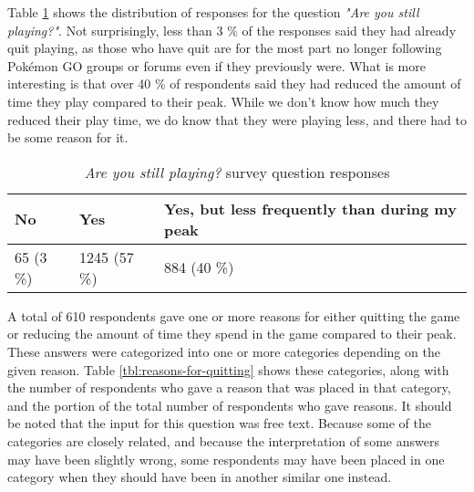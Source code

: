 
Table \ref{tbl:still-playing} shows the distribution of responses for the question \emph{"Are you still playing?"}. Not surprisingly, less than 3 \% of the responses said they had already quit playing, as those who have quit are for the most part no longer following Pokémon GO groups or forums even if they previously were. What is more interesting is that over 40 \% of respondents said they had reduced the amount of time they play compared to their peak. While we don't know how much they reduced their play time, we do know that they were playing less, and there had to be some reason for it.

\begin{table}[h]
	\centering
	\begin{tabular}{|l|l|l|}
		\hline
		\textbf{No} & \textbf{Yes} & \textbf{Yes, but less frequently than during my peak}\\
		\hline\hline
		65 (3 \%) & 1245 (57 \%) & 884 (40 \%)\\\hline
	\end{tabular}
	\caption{\emph{Are you still playing?} survey question responses}
	\label{tbl:still-playing}
\end{table}

A total of 610 respondents gave one or more reasons for either quitting the game or reducing the amount of time they spend in the game compared to their peak. These answers were categorized into one or more categories depending on the given reason. Table \ref{tbl:reasons-for-quitting} shows these categories, along with the number of respondents who gave a reason that was placed in that category, and the portion of the total number of respondents who gave reasons. It should be noted that the input for this question was free text. Because some of the categories are closely related, and because the interpretation of some answers may have been slightly wrong, some respondents may have been placed in one category when they should have been in another similar one instead.

